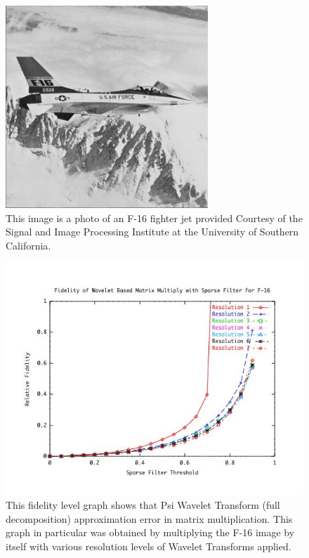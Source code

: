 \begin{figure}
\includegraphics [width=3in]{f16.jpg}
\caption{This image is a photo of an F-16 fighter jet provided Courtesy of the Signal and Image Processing Institute at the University of Southern California.  \cite{f16}}
\label{image f16}
\end{figure}


\begin{figure}
\includegraphics [width=5.5in]{f16resultsA.jpg}
\caption{This fidelity level graph shows that Psi Wavelet Transform (full decomposition) approximation error in matrix multiplication.  This graph in particular was obtained by multiplying the F-16 image by itself with various resolution levels of Wavelet Transforms applied. \cite{f16} }
\label{image f16 fidelity}

\end{figure}

